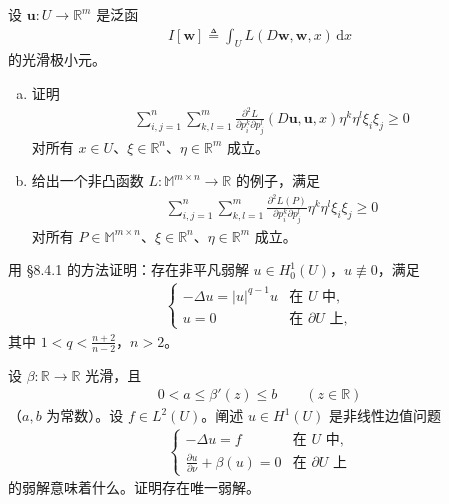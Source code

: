 \documentclass[../../main.tex]{subfiles}
\begin{document}
\begin{exercise}[方程组的二阶变分]\label{exercise:ch08-7-9}设 $\mathbf{u}:U\to\mathbb{R}^m$ 是泛函
\begin{align*}
I[\mathbf{w}]\triangleq\int_U L(D\mathbf{w},\mathbf{w},x)\,\mathrm{d}x
\end{align*}
的光滑极小元。
\begin{enumerate}[(a)]
\item 证明
\begin{align*}
\sum_{i,j=1}^n\sum_{k,l=1}^m\frac{\partial^2 L}{\partial p_i^k\partial p_j^l}(D\mathbf{u},\mathbf{u},x)\eta^k\eta^l\xi_i\xi_j\geqslant 0
\end{align*}
对所有 $x\in U$、$\xi\in\mathbb{R}^n$、$\eta\in\mathbb{R}^m$ 成立。
\item 给出一个非凸函数 $L:\mathbb{M}^{m\times n}\to\mathbb{R}$ 的例子，满足
\begin{align*}
\sum_{i,j=1}^n\sum_{k,l=1}^m\frac{\partial^2 L(P)}{\partial p_i^k\partial p_j^l}\eta^k\eta^l\xi_i\xi_j\geqslant 0
\end{align*}
对所有 $P\in\mathbb{M}^{m\times n}$、$\xi\in\mathbb{R}^n$、$\eta\in\mathbb{R}^m$ 成立。
\end{enumerate}
\end{exercise}

\begin{exercise}\label{exercise:ch08-7-10}
用 \S8.4.1 的方法证明：存在非平凡弱解 $u\in H_0^1(U)$，$u\not\equiv 0$，满足
\begin{align*}
\begin{cases}
-\Delta u=|u|^{q-1}u&\text{在 }U\text{ 中},\\
u=0&\text{在 }\partial U\text{ 上},
\end{cases}
\end{align*}
其中 $1<q<\frac{n+2}{n-2}$，$n>2$。
\end{exercise}

\begin{exercise}\label{exercise:ch08-7-11}
设 $\beta:\mathbb{R}\to\mathbb{R}$ 光滑，且
\begin{align*}
0<a\leqslant\beta'(z)\leqslant b\qquad (z\in\mathbb{R})
\end{align*}
（$a,b$ 为常数）。设 $f\in L^2(U)$。阐述 $u\in H^1(U)$ 是非线性边值问题
\begin{align*}
\begin{cases}
-\Delta u=f&\text{在 }U\text{ 中},\\
\frac{\partial u}{\partial\nu}+\beta(u)=0&\text{在 }\partial U\text{ 上}
\end{cases}
\end{align*}
的弱解意味着什么。证明存在唯一弱解。
\end{exercise}
\end{document}
